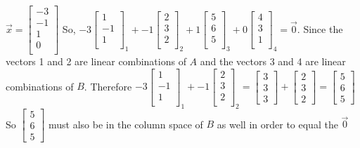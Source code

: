 \documentclass[]{exam}
\begin{document}
\begin{questions}
\begin{parts}
\begin{solution}
				$\vec{x}=\begin{bmatrix}
				    -3 \\ -1 \\ 1 \\ 0 \\
				\end{bmatrix}$ So,
				\newline
				$-3\begin{bmatrix}
				    1 \\ -1 \\ 1 \\ 
				\end{bmatrix}_1+ -1\begin{bmatrix}
				    2 \\ 3 \\ 2 \\ 
				\end{bmatrix}_2+1\begin{bmatrix}
				    5 \\ 6 \\ 5 \\ 
				\end{bmatrix}_3+0\begin{bmatrix}
				    4 \\ 3 \\ 1 \\ 
				\end{bmatrix}_4=\vec{0}$. Since the vectors 1 and 2 are linear combinations of $A$ and the vectors 3 and 4 are linear combinations of $B$.  Therefore 
				\newline
				$-3\begin{bmatrix}
				    1 \\ -1 \\ 1 \\ 
				\end{bmatrix}_1+ -1\begin{bmatrix}
				    2 \\ 3 \\ 2 \\ 
				\end{bmatrix}_2=\begin{bmatrix}
				    3 \\ 3 \\ 3
				\end{bmatrix}+\begin{bmatrix}
				    2 \\ 3 \\ 2
				\end{bmatrix}=\begin{bmatrix}
				    5 \\ 6 \\ 5
				\end{bmatrix}$
				\newline
				So $\begin{bmatrix}
				    5 \\ 6 \\ 5
				\end{bmatrix}$ must also be in the column space of $B$ as well in order to equal the $\vec{0}$
			\end{solution}	

\end{parts}
\end{questions}
\end{document}
